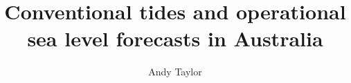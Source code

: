 \documentclass[11pt,a4paper,titlepage,twoside,openrigh]{book}
\title{Conventional tides and operational sea level forecasts in Australia}
\author{Andy Taylor}
\begin{document}
	\begin{frontmatter}
		\frontmatterheadings    %
		\maketitle              %
		\makedeclaration        %
		
		
		
		{
			\singlespacing
			\tableofcontents
			\listoffigures
		   \clearpage
		}
   \end{frontmatter}
	\begin{mainmatter}
		\mainmatterheadings
		
		
		
		
		
	\end{mainmatter}
	
    \begin{appendix}
		
	\end{appendix}
\end{document}
